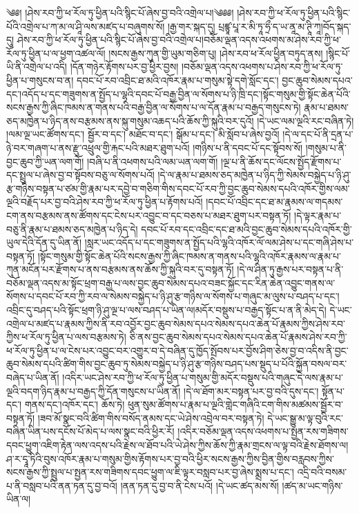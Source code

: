 ༄༅། །ཤེས་རབ་ཀྱི་ཕ་རོལ་ཏུ་ཕྱིན་པའི་སྙིང་པོ་ཞེས་བྱ་བའི་འགྲེལ་པ།༄༅༅། །ཤེས་རབ་ཀྱི་ཕ་རོལ་ཏུ་ཕྱིན་པའི་སྙིང་པོའི་འགྲེལ་པ་ཀ་མ་ལ་ཤཱི་ལས་མཛད་པ་བཞུགས་སོ། །རྒྱ་གར་སྐད་དུ། པྲཛྙཱ་པཱ་ར་མི་ཏཱ་ཧྲྀ་ད་ཡ་ནཱ་མ་ཊཱི་ཀཱ།བོད་སྐད་དུ། ཤེས་རབ་ཀྱི་ཕ་རོལ་ཏུ་ཕྱིན་པའི་སྙིང་པོ་ཞེས་བྱ་བའི་འགྲེལ་པ།བཅོམ་ལྡན་འདས་འཕགས་མ་ཤེས་རབ་ཀྱི་ཕ་རོལ་ཏུ་ཕྱིན་པ་ལ་ཕྱག་འཚལ་ལོ། །སངས་རྒྱས་ཀུན་གྱི་ཡུམ་གཅིག་པུ། །ཤེས་རབ་ཕ་རོལ་ཕྱིན་བཏུད་ནས། །སྙིང་པོ་ཡི་ནི་འགྲེལ་པ་འདི། །དོན་གཉེར་རྟོགས་པར་བྱ་ཕྱིར་བྱས། །བཅོམ་ལྡན་འདས་འཕགས་པ་ཤེས་རབ་ཀྱི་ཕ་རོལ་ཏུ་ཕྱིན་པ་གསུངས་བ་ན། དབང་པོ་རབ་འབྲིང་ཐ་མའི་འཁོར་རྣམ་པ་གསུམ་སྟེ་དགེ་སློང་དང་། བྱང་ཆུབ་སེམས་དཔའ་དང་།འདོད་པ་དང་གཟུགས་ན་སྤྱོད་པ་ལྷའི་དབང་པོ་བརྒྱ་བྱིན་ལ་སོགས་པ་ཉི་ཁྲི་དང་།སྟོང་གསུམ་གྱི་སྟོང་ཆེན་པོའི་སངས་རྒྱས་ཀྱི་ཞིང་ཁམས་ན་གནས་པའི་བརྒྱ་བྱིན་ལ་སོགས་པ་ལ་དོན་རྣམ་པ་བརྒྱད་གསུངས་ཏེ། རྣམ་པ་ཐམས་ཅད་མཁྱེན་པ་ཉིད་ནས་བརྩམས་ནས་སྐུ་གསུམ་འཆད་པའི་ཆོས་ཀྱི་སྐུའི་བར་དུའོ། །དེ་ཡང་ལམ་ལྔའི་རང་བཞིན་ཏེ། །ལམ་ལྔ་ཡང་ཚོགས་དང་། སྦྱོར་བ་དང་། མཐོང་བ་དང་། སྒོམ་པ་དང་། མི་སློབ་པ་ཞེས་བྱའོ། །དེ་ལ་དང་པོ་ནི་དྲན་པ་ཉེ་བར་གཞག་པ་ནས་རྫུ་འཕྲུལ་གྱི་རྐང་པའི་མཐར་ཐུག་པའོ། །གཉིས་པ་ནི་དབང་པོ་དང་སྟོབས་སོ། །གསུམ་པ་ནི་བྱང་ཆུབ་ཀྱི་ཡན་ལག་གོ། །བཞི་པ་ནི་འཕགས་པའི་ལམ་ཡན་ལག་གོ། །ལྔ་པ་ནི་ཆོས་དང་ལོངས་སྤྱོད་རྫོགས་པ་དང་སྤྲུལ་པ་ཞེས་བྱ་བ་སྟོབས་བཅུ་ལ་སོགས་པའོ། །དེ་ལ་རྣམ་པ་ཐམས་ཅད་མཁྱེན་པ་ཉིད་ཀྱི་སེམས་བསྐྱེད་པ་ཉི་ཤུ་རྩ་གཉིས་བསྟན་པ་ཙམ་གྱི་རྣམ་པར་དབྱེ་བ་གཅིག་གིས་དབང་པོ་རབ་ཀྱི་བྱང་ཆུབ་སེམས་དཔའི་འཁོར་གྱིས་ལམ་ལྔའི་བརྗོད་པར་བྱ་བའི་ཤེས་རབ་ཀྱི་ཕ་རོལ་ཏུ་ཕྱིན་པ་རྟོགས་པའོ། །དབང་པོ་འབྲིང་དང་ཐ་མ་རྣམས་ལ་གདམས་ངག་ནས་བརྩམས་ནས་ཚོགས་དང་ངེས་པར་འབྱུང་བ་དང་བཅས་པ་མཐར་ཐུག་པར་བསྟན་ཏོ། །དེ་ལྟར་རྣམ་པ་བཅུ་ནི་རྣམ་པ་ཐམས་ཅད་མཁྱེན་པ་ཉིད་དེ། དབང་པོ་རབ་དང་འབྲིང་དང་ཐ་མའི་བྱང་ཆུབ་སེམས་དཔའི་འཁོར་གྱི་ཡུལ་དེའི་དོན་དུ་ཡིན་ནོ། །སླར་ཡང་འདོད་པ་དང་གཟུགས་ན་སྤྱོད་པའི་ལྷའི་འཁོར་ལོ་ལམ་ཤེས་པ་དང་གཞི་ཤེས་པ་བསྟན་ཏོ། །སྟོང་གསུམ་གྱི་སྟོང་ཆེན་པོའི་སངས་རྒྱས་ཀྱི་ཞིང་ཁམས་ན་གནས་པའི་ལྷའི་འཁོར་རྣམས་ལ་རྣམ་པ་ཀུན་མངོན་པར་རྫོགས་པ་ནས་བརྩམས་ནས་ཆོས་ཀྱི་སྐུའི་བར་དུ་བསྟན་ཏོ། །དེ་ལ་ཤིན་ཏུ་རྒྱས་པར་བསྟན་པ་ནི་བཅོམ་ལྡན་འདས་མ་སྟོང་ཕྲག་བརྒྱ་པ་ལས་བྱང་ཆུབ་སེམས་དཔའ་བཟང་སྐྱོང་དང་རིན་ཆེན་འབྱུང་གནས་ལ་སོགས་པ་དབང་པོ་རབ་ཀྱི་རབ་ལ་སེམས་བསྐྱེད་པ་ཉི་ཤུ་རྩ་གཉིས་ལ་སོགས་པ་གཞུང་མ་ལུས་པ་བཤད་པ་དང་། འབྲིང་དུ་བཤད་པའི་སྟོང་ཕྲག་ཉི་ཤུ་ལྔ་པ་ལས་བཤད་པ་ཡིན་ལ།མདོར་བསྡུས་པ་བརྒྱད་སྟོང་པ་ན་ནི་མེད་དེ། དེ་ཡང་འགྲེལ་པ་མཛད་པ་རྣམས་ཀྱིས་ནི་རབ་འབྱོར་བྱང་ཆུབ་སེམས་དཔའ་སེམས་དཔའ་ཆེན་པོ་རྣམས་ཀྱིས་ཤེས་རབ་ཀྱིས་ཕ་རོལ་ཏུ་ཕྱིན་པ་ལས་བརྩམས་ཏེ། ཅི་ནས་བྱང་ཆུབ་སེམས་དཔའ་སེམས་དཔའ་ཆེན་པོ་རྣམས་ཤེས་རབ་ཀྱི་ཕ་རོལ་ཏུ་ཕྱིན་པ་ལ་ངེས་པར་འབྱུང་བར་འགྱུར་བ་དེ་བཞིན་དུ་ཁྱོད་སྤོབས་པར་བྱོས་ཤིག་ཅེས་བྱ་བ་འདིས་ནི་བྱང་ཆུབ་སེམས་དཔའི་ཚིག་གིས་བྱང་ཆུབ་ཏུ་སེམས་བསྐྱེད་པ་ཉི་ཤུ་རྩ་གཉིས་བཤད་པས་སྡུད་པ་པོའི་སྐྱོན་བསལ་བར་བཞེད་པ་ཡིན་ནོ། །འདིར་ཡང་ཤེས་རབ་ཀྱི་ཕ་རོལ་ཏུ་ཕྱིན་པ་གསུམ་གྱི་མདོར་བསྡུས་པའི་གཞུང་དེ་ལས་རྣམ་པ་ལྔའི་བདག་ཉིད་རྣམ་པ་བརྒྱད་ཀྱི་དོན་གསུངས་པ་ཡིན་ནོ། །དེ་ལ་ཐོག་མར་བསྟན་པར་བྱ་བའི་དུས་དང་། སྟོན་པ་དང་། གནས་དང་།འཁོར་དང་། ཆོས་ཏེ། ཕུན་སུམ་ཚོགས་པ་རྣམ་པ་ལྔའི་གླེང་གཞིའི་ངག་གིས་མཚམས་སྦྱོར་བ་བསྟན་ཏོ། །ཟབ་མོ་སྣང་བའི་ཚིག་གིས་བསོད་ནམས་དང་ཡེ་ཤེས་འབྲེལ་བར་བསྟན་ཏེ། དེ་ཡང་སྒྱུ་མ་ལྟ་བུའི་རང་བཞིན་ཡིན་པས་དངོས་པོ་མེད་པ་ལས་སྣང་བའི་ཕྱིར་རོ། །འདིར་བཅོམ་ལྡན་འདས་འཕགས་པ་སྤྱན་རས་གཟིགས་དབང་ཕྱུག་འཇིག་རྟེན་ལས་འདས་པའི་རྗེས་ལ་ཐོབ་པའི་ཡེ་ཤེས་ཀྱིས་ཆོས་ཀྱི་རྣམ་གྲངས་ལ་ལྟ་བའི་རྗེས་ཐོགས་ལ། ཤ་ར་དྭཱ་ཏིའི་བུས་འཁོར་རྣམ་པ་གསུམ་གྱིས་རྟོགས་པར་བྱ་བའི་ཕྱིར་སངས་རྒྱས་ཀྱིས་བྱིན་གྱིས་བརླབས་ཀྱིས་སངས་རྒྱས་ཀྱི་སྤྲུལ་པ་སྤྱན་རས་གཟིགས་དབང་ཕྱུག་ལ་ཇི་ལྟར་བསླབ་པར་བྱ་ཞེས་སྨྲས་པ་དང་། འདྲི་བའི་བསམ་པ་ནི་བསླབ་པའི་ནན་ཏན་དུ་བྱ་བའོ། །ནན་ཏན་དུ་བྱ་བ་ནི་ངེས་པའོ། །དེ་ཡང་ཚད་མས་སོ། །ཚད་མ་ཡང་གཉིས་ཡིན་ལ། 